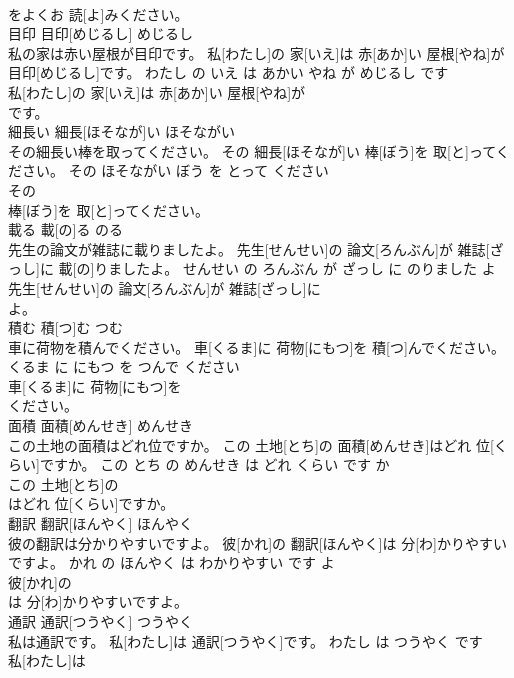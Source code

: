 \documentclass[8pt]{extreport}
\begin{document}
\begin{CJK}{UTF8}{min}
\\	をよくお 読[よ]みください。			
\\	目印	目印[めじるし]	めじるし	
\\	私の家は赤い屋根が目印です。	私[わたし]の 家[いえ]は 赤[あか]い 屋根[やね]が 目印[めじるし]です。	わたし の いえ は あかい やね が めじるし です	
\\	私[わたし]の 家[いえ]は 赤[あか]い 屋根[やね]が
\\	です。			
\\	細長い	細長[ほそなが]い	ほそながい	
\\	その細長い棒を取ってください。	その 細長[ほそなが]い 棒[ぼう]を 取[と]ってください。	その ほそながい ぼう を とって ください	
\\	その
\\	棒[ぼう]を 取[と]ってください。			
\\	載る	載[の]る	のる	
\\	先生の論文が雑誌に載りましたよ。	先生[せんせい]の 論文[ろんぶん]が 雑誌[ざっし]に 載[の]りましたよ。	せんせい の ろんぶん が ざっし に のりました よ	
\\	先生[せんせい]の 論文[ろんぶん]が 雑誌[ざっし]に
\\	よ。			
\\	積む	積[つ]む	つむ	
\\	車に荷物を積んでください。	車[くるま]に 荷物[にもつ]を 積[つ]んでください。	くるま に にもつ を つんで ください	
\\	車[くるま]に 荷物[にもつ]を
\\	ください。			
\\	面積	面積[めんせき]	めんせき	
\\	この土地の面積はどれ位ですか。	この 土地[とち]の 面積[めんせき]はどれ 位[くらい]ですか。	この とち の めんせき は どれ くらい です か	
\\	この 土地[とち]の
\\	はどれ 位[くらい]ですか。			
\\	翻訳	翻訳[ほんやく]	ほんやく	
\\	彼の翻訳は分かりやすいですよ。	彼[かれ]の 翻訳[ほんやく]は 分[わ]かりやすいですよ。	かれ の ほんやく は わかりやすい です よ	
\\	彼[かれ]の
\\	は 分[わ]かりやすいですよ。			
\\	通訳	通訳[つうやく]	つうやく	
\\	私は通訳です。	私[わたし]は 通訳[つうやく]です。	わたし は つうやく です	
\\	私[わたし]は

\end{CJK}
\end{document}

